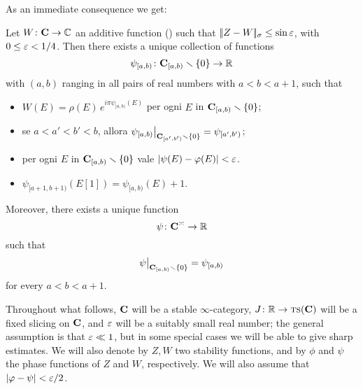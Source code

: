 As an immediate consequence we get:
\begin{corollary}Let $W\colon \textbf{C}\to\mathbb{C}$ an additive function (\adef {}) such that $|\!|Z-W|\!|_\sigma \le\sin\varepsilon$, with $0\leq \varepsilon <1/4$. Then there exists a unique collection of functions
 \[
\psi_{[a,b)}\colon \textbf{C}_{[a,b)}\smallsetminus \{0\} \to \mathbb{R}
\]
with $(a,b)$ ranging in all pairs of real numbers with $a<b<a+1$, such that
\begin{itemize}
\item $W(E)=\rho(E)\, e^{i\pi \psi_{[a,b)}(E)}$ per ogni $E$ in $\textbf{C}_{[a,b)}\smallsetminus \{0\}$;
\item se $a<a'<b'<b$, allora $\psi_{[a,b)}\bigr\vert_{\textbf{C}_{[a',b')}\smallsetminus \{0\}}=\psi_{[a',b')}$;
\item per ogni $E$ in $\textbf{C}_{[a,b)}\smallsetminus \{0\}$ vale $|\psi(E)-\varphi(E)|<\varepsilon $.
\item $\psi_{[a+1,b+1)}(E[1])=\psi_{[a,b)}(E)+1$.
\end{itemize}
Moreover, there exists a unique function
\[
\psi\colon \textbf{C}^\asymp\to \mathbb{R}
\]
such that 
\[
\psi\bigr\vert_{\textbf{C}_{[a,b)}\smallsetminus \{0\}}=\psi_{[a,b)}
\]
for every $a<b<a+1$.
\end{corollary}


\begin{notat}\label{notat.close.stabilities}
Throughout what follows, $\textbf{C}$ will be a stable $\infty$\hyp{}category, $J\colon \mathbb{R}\to \text{\scshape ts}(\textbf{C})$ will be a fixed slicing on $\textbf{C}$, and $\varepsilon$ will be a suitably small real number; the general assumption is that $\varepsilon\ll 1$, but in some special cases we will be able to give sharp estimates. We will also denote by $Z,W$ two stability functions, and by $\phi$  and $\psi$ the phase functions of  $Z$ and $W$, respectively. We will also assume that $|\varphi-\psi|<\varepsilon /2$.
\end{notat}


